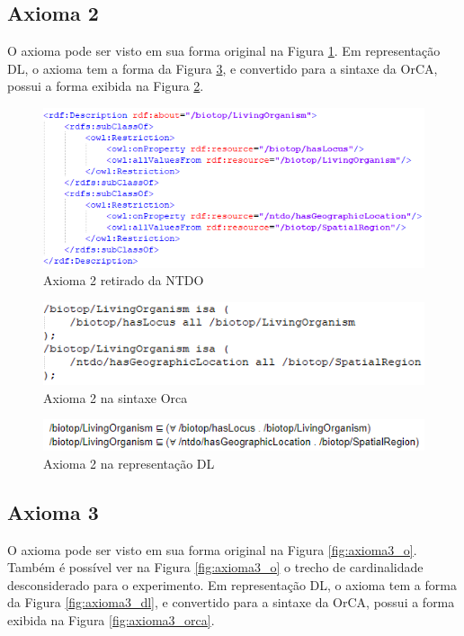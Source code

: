 \documentclass{bcc}
\begin{document}
\subsection{Axioma 2}
O axioma pode ser visto em sua forma original na Figura \ref{fig:axioma2_o}. Em representação DL, o axioma tem a forma da Figura \ref{fig:axioma2_dl}, e convertido para a sintaxe da OrCA, possui a forma exibida na Figura \ref{fig:axioma2_orca}. 

\begin{figure}[H]
\centering
\includegraphics[width=.8\textwidth]{Figuras/axioma2_o.png}
\caption{Axioma 2 retirado da NTDO} 
\label{fig:axioma2_o}
\end{figure}

\begin{figure}[H]
\centering
\includegraphics[width=.7\textwidth]{Figuras/axioma2_orca.png}
\caption{Axioma 2 na sintaxe Orca} 
\label{fig:axioma2_orca}
\end{figure}

\begin{figure}[H]
\centering
\includegraphics[width=.7\textwidth]{Figuras/axioma2_dl.png}
\caption{Axioma 2 na representação DL} 
\label{fig:axioma2_dl}
\end{figure}

\subsection{Axioma 3}
O axioma pode ser visto em sua forma original na Figura \ref{fig:axioma3_o}. Também é possível ver na Figura \ref{fig:axioma3_o} o trecho de cardinalidade desconsiderado para o experimento. Em representação DL, o axioma tem a forma da Figura \ref{fig:axioma3_dl}, e convertido para a sintaxe da OrCA, possui a forma exibida na Figura \ref{fig:axioma3_orca}. 
\end{document}
